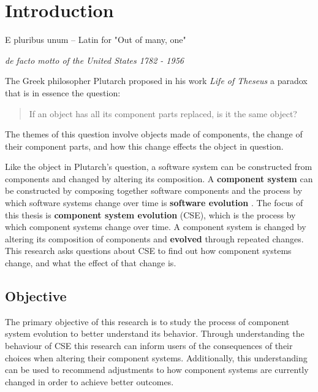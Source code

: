 \chapter{Introduction}
\label{introduction}
\epigraph{E pluribus unum -- Latin for "Out of many, one"}
{\textit{de facto motto of the United States 1782 - 1956}}
The Greek philosopher Plutarch proposed in his work \textit{Life of Theseus} a paradox that is in essence the question:
\begin{quote}
If an object has all its component parts replaced, is it the same object?
\end{quote}
The themes of this question involve objects made of components, the change of their component parts,
and how this change effects the object in question.

Like the object in Plutarch's question, a software system can be constructed from components and changed by altering its composition.
A \textbf{component system} can be constructed by composing together software components \citep{Szyperski2002}
and the process by which software systems change over time is \textbf{software evolution} \citep{lehman1980}.
The focus of this thesis is \textbf{component system evolution} (CSE), which is the process by which component systems change over time.
A component system is changed by altering its composition of components and \textbf{evolved} through repeated changes.
This research asks questions about CSE to find out how component systems change, and what the effect of that change is.

\section{Objective}
The primary objective of this research is to study the process of component system evolution to better understand its behavior.
Through understanding the behaviour of CSE this research can inform users of the consequences of their choices when altering their component systems.
Additionally, this understanding can be used to recommend adjustments to how component systems are currently changed in order to achieve better outcomes. 


